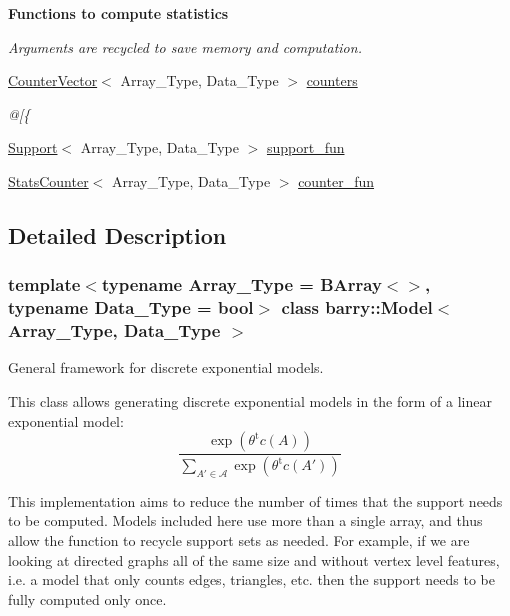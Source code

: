 \begin{Indent}\textbf{ Functions to compute statistics}\par
{\em Arguments are recycled to save memory and computation. }\begin{DoxyCompactItemize}
\item 
\hyperlink{classbarry_1_1_counter_vector}{Counter\+Vector}$<$ Array\+\_\+\+Type, Data\+\_\+\+Type $>$ \hyperlink{classbarry_1_1_model_a8d045fb12c7340681c942d2aade3d088}{counters}
\begin{DoxyCompactList}\small\item\em @\mbox{[}\{ \end{DoxyCompactList}\item 
\hyperlink{classbarry_1_1_support}{Support}$<$ Array\+\_\+\+Type, Data\+\_\+\+Type $>$ \hyperlink{classbarry_1_1_model_aa40caa45d0d8ca5d0f16e8dadb0db5ce}{support\+\_\+fun}
\item 
\hyperlink{classbarry_1_1_stats_counter}{Stats\+Counter}$<$ Array\+\_\+\+Type, Data\+\_\+\+Type $>$ \hyperlink{classbarry_1_1_model_a1c848eda59386aaa81346cff9565268b}{counter\+\_\+fun}
\end{DoxyCompactItemize}
\end{Indent}


\subsection{Detailed Description}
\subsubsection*{template$<$typename Array\+\_\+\+Type = B\+Array$<$$>$, typename Data\+\_\+\+Type = bool$>$\newline
class barry\+::\+Model$<$ Array\+\_\+\+Type, Data\+\_\+\+Type $>$}

General framework for discrete exponential models. 

This class allows generating discrete exponential models in the form of a linear exponential model\+: \[ \frac{ \exp{\left(\theta^{\mbox{t}}c(A)\right)} }{ \sum_{A'\in \mathcal{A}}\exp{\left(\theta^{\mbox{t}}c(A')\right)} } \]

This implementation aims to reduce the number of times that the support needs to be computed. Models included here use more than a single array, and thus allow the function to recycle support sets as needed. For example, if we are looking at directed graphs all of the same size and without vertex level features, i.\+e. a model that only counts edges, triangles, etc. then the support needs to be fully computed only once. 

